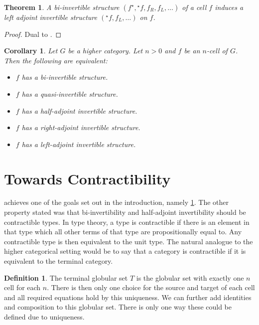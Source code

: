 \documentclass{article}
\newtheorem{theorem}{Theorem}
\newtheorem{cor}{Corollary}
\theoremstyle{definition}
\newtheorem{definition}{Definition}
\theoremstyle{remark}
\newcommand{\linv}[1]{{}^\star\!#1}
\newcommand{\rinv}[1]{#1^\star}
\begin{document}
\begin{theorem}
  A bi-invertible structure \((\rinv f, \linv f, f_R, f_L, \dots)\) of a cell \(f\) induces a left adjoint invertible structure \((\linv f, f_L, \dots)\) on \(f\).
\end{theorem}
\begin{proof}
  Dual to .
\end{proof}

\begin{cor}\label{cor:equiv}
  Let \(G\) be a higher category. Let \(n > 0\) and \(f\) be an \(n\)-cell of \(G\). Then the following are equivalent:
  \begin{itemize}
  \item \(f\) has a bi-invertible structure.
  \item \(f\) has a quasi-invertible structure.
  \item \(f\) has a half-adjoint invertible structure.
  \item \(f\) has a right-adjoint invertible structure.
  \item \(f\) has a left-adjoint invertible structure.
  \end{itemize}
\end{cor}

\section{Towards Contractibility}\label{sec:contractibility}

 achieves one of the goals set out in the introduction, namely \cref{cor:equiv}. The other property stated was that bi-invertibility and half-adjoint invertibility should be contractible types. In type theory, a type is contractible if there is an element in that type which all other terms of that type are propositionally equal to. Any contractible type is then equivalent to the unit type. The natural analogue to the higher categorical setting would be to say that a category is contractible if it is equivalent to the terminal category.

\begin{definition}
  The terminal globular set \(T\) is the globular set with exactly one \(n\) cell for each \(n\). There is then only one choice for the source and target of each cell and all required equations hold by this uniqueness.
  We can further add identities and composition to this globular set. There is only one way these could be defined due to uniqueness.
\end{definition}
\end{document}
